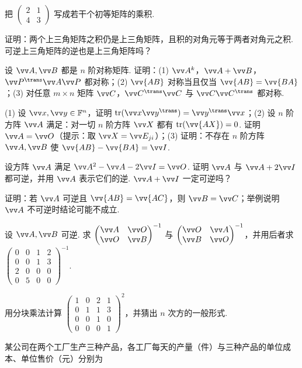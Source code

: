 {\begin{exA}
			\item\label{ex:mat:A10} 把 $\begin{pmatrix}2&1\\4&3\end{pmatrix}$ 写成若干个初等矩阵的乘积.
			\item\label{ex:mat:A11} 证明：两个上三角矩阵之积仍是上三角矩阵，且积的对角元等于两者对角元之积. 可逆上三角矩阵的逆也是上三角矩阵吗？
			\item\label{ex:mat:A12} 设 $\vv A,\vv B$ 都是 $n$ 阶对称矩阵. 证明：(1) $\vv A^k$，$\vv A+\vv B$，$\vv P^\trans\vv A\vv P$ 都对称；(2) $\vv{AB}$ 对称当且仅当 $\vv{AB}=\vv{BA}$；(3) 对任意 $m\times n$ 矩阵 $\vv C$，$\vv C^\trans\vv C$ 与 $\vv C\vv C^\trans$ 都对称.
			\item\label{ex:mat:A13} (1) 设 $\vv x,\vv y\in\mathbb{F}^n$，证明 $\tr(\vv x\vv y^\trans)=\vv y^\trans\vv x$；(2) 设 $n$ 阶方阵 $\vv A$ 满足：对一切 $n$ 阶方阵 $\vv X$ 都有 $\tr(\vv{AX})=0$. 证明 $\vv A=\vv O$（提示：取 $\vv X=\vv E_{ji}$）；(3) 证明：不存在 $n$ 阶方阵 $\vv A,\vv B$ 使 $\vv{AB}-\vv{BA}=\vv I$.
			\item\label{ex:mat:A14} 设方阵 $\vv A$ 满足 $\vv A^2-\vv A-2\vv I=\vv O$. 证明 $\vv A$ 与 $\vv A+2\vv I$ 都可逆，并用 $\vv A$ 表示它们的逆. $\vv A+\vv I$ 一定可逆吗？
			\item\label{ex:mat:A15} 证明：若 $\vv A$ 可逆且 $\vv{AB}=\vv{AC}$，则 $\vv B=\vv C$；举例说明 $\vv A$ 不可逆时结论可能不成立.
			\item\label{ex:mat:A16} 设 $\vv A,\vv B$ 可逆. 求 $\begin{pmatrix}\vv A&\vv O\\ \vv O&\vv B\end{pmatrix}^{-1}$ 与 $\begin{pmatrix}\vv O&\vv A\\ \vv B&\vv O\end{pmatrix}^{-1}$，并用后者求 $\begin{pmatrix}0&0&1&2\\0&0&1&3\\2&0&0&0\\0&5&0&0\end{pmatrix}^{-1}$.
			\item\label{ex:mat:A17} 用分块乘法计算 $\begin{pmatrix}1&0&2&1\\0&1&1&3\\0&0&1&0\\0&0&0&1\end{pmatrix}^2$，并猜出 $n$ 次方的一般形式.
			\item\label{ex:mat:A18} 某公司在两个工厂生产三种产品，各工厂每天的产量（件）与三种产品的单位成本、单位售价（元）分别为

\end{exA}}
